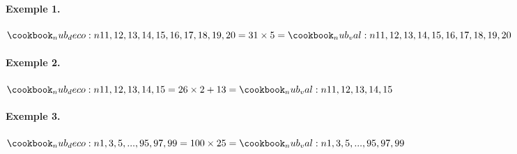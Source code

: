 \documentclass[varwidth, border=3pt]{standalone}
\begin{document}
\paragraph{Exemple 1.}

$ \nub{11, 12, 13, 14, 15, 16, 17, 18, 19, 20}
= 31 \times 5
= \nub*{11, 12, 13, 14, 15, 16, 17, 18, 19, 20}$


\paragraph{Exemple 2.}

$ \nub{11, 12, 13, 14, 15}
= 26 \times 2 + 13
= \nub*{11, 12, 13, 14, 15}$


\paragraph{Exemple 3.}

$ \nub{1, 3, 5,..., 95, 97, 99}
= 100 \times 25
= \nub*{1, 3, 5,..., 95, 97, 99}$
\end{document}
